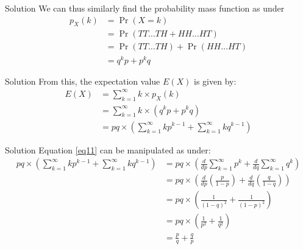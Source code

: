 \documentclass{beamer}
\providecommand{\pr}[1]{\ensuremath{\Pr\left(#1\right)}}
\providecommand{\brak}[1]{\ensuremath{\left(#1\right)}}
\begin{document}
\begin{frame}{Solution}
    We can thus similarly find the probability mass function as under
    \begin{align}
     p_X(k)&=\pr{X=k} \\
           &= \pr{TT \ldots TH + HH \ldots HT} \\
           &= \pr{TT \ldots TH} + \pr{HH \ldots HT} \\
           &= q^kp + p^kq
 \end{align}
\end{frame}


\begin{frame}{Solution}
From this, the expectation value $E(X)$ is given by:
\begin{align}
    E(X) &= \sum_{k=1} ^ \infty {k \times p_X(k)} \\
         &= \sum_{k=1} ^ \infty {k \times (q^kp + p^kq)} \\
         \label{eq11}
         &= pq \times \brak{\sum_{k=1} ^ \infty {kp^{k-1}} + \sum_{k=1} ^ \infty {kq^{k-1}} }
\end{align}

\end{frame}

\begin{frame}{Solution}
Equation \ref{eq11} can be manipulated as under:
\begin{align}
   pq \times \brak{\sum_{k=1} ^ \infty {kp^{k-1}} + \sum_{k=1} ^ \infty {kq^{k-1}} } &=  pq \times \brak{ \frac{d}{dp} \sum_{k=1} ^ \infty {p^{k}} + \frac{d}{dq} \sum_{k=1} ^ \infty {q^{k}}} \\
     &= pq \times \brak{ \frac{d}{dp} \brak{\frac{p}{1-p}} + \frac{d}{dq} \brak{\frac{q}{1-q}}} \\
     &= pq \times \brak{\frac{1}{(1-q)^2}+\frac{1}{(1-p)^2}} \\
     &= pq \times \brak{\frac{1}{p^2}+\frac{1}{q^2}} \\
     &= \frac{p}{q} + \frac{q}{p}
\end{align}

\end{frame}
\end{document}
